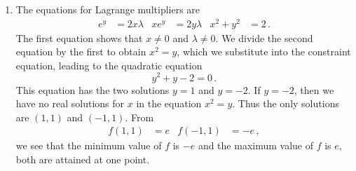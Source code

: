 \begin{solution}
\begin{enumerate}
\item
The equations for Lagrange multipliers are
\begin{align*}
e^y &= 2x \lambda &
xe^y &= 2y\lambda &
x^2 + y^2 &= 2 \,.
\end{align*}
The first equation shows that $x \neq 0$ and $\lambda \neq 0$. We divide the second equation by the first to obtain $x^2 = y$, which we substitute into the constraint equation, leading to the quadratic equation
\[
y^2 + y - 2 = 0\,.
\]
This equation has the two solutions $y=1$ and $y=-2$. If $y=-2$, then we have no real solutions for $x$ in the equation $x^2=y$. Thus the only solutions are $(1,1)$ and $(-1,1)$. From
\begin{align*}
f(1,1) &= e & f(-1,1) &= -e\,,
\end{align*}
we see that the minimum value of $f$ is $-e$ and the maximum value of $f$ is $e$, both are attained at one point.
\end{enumerate}
\end{solution}





